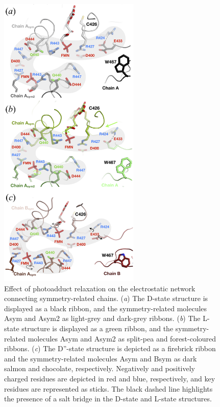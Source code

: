 \begin{figure}[H] %
    \centering
    \noindent \includegraphics[width=0.6\textwidth]{images/LOV2/LOV2slow_Fig9.pdf}
    \hfill
    \caption{Effect of photoadduct relaxation on the electrostatic network connecting symmetry-related chains. (\textit{a}) The D-state structure is displayed as a black ribbon, and the symmetry-related molecules Asym and Asym2 as light-grey and dark-grey ribbons. (\textit{b}) The L-state structure is displayed as a green ribbon, and the symmetry-related molecules Asym and Asym2 as split-pea and forest-coloured ribbons. (\textit{c}) The D''-state structure is depicted as a firebrick ribbon and the symmetry-related molecules Asym and Bsym as dark salmon and chocolate, respectively. Negatively and positively charged residues are depicted in red and blue, respectively, and key residues are represented as sticks. The black dashed line highlights the presence of a salt bridge in the D-state and L-state structures.}
    \label{fig:LOV2slowSGswitch}
\end{figure}
